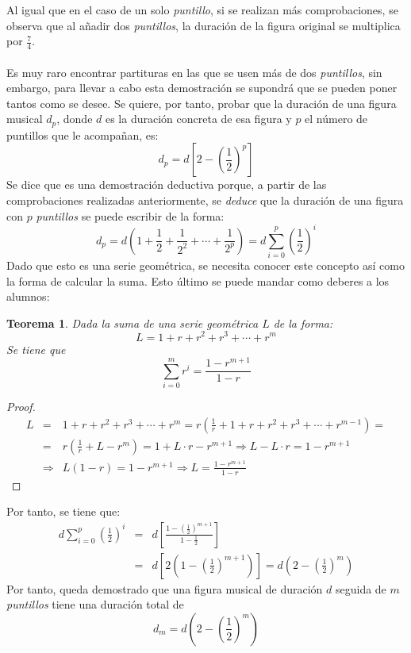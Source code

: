 \documentclass[a4paper, openright, 11pt, titlepage]{report}
\newtheorem{teor}[propo]{Teorema}
\theoremstyle{definition}\newtheorem{defin}[propo]{Definition}
\theoremstyle{definition}\newtheorem{obser}[propo]{Remark}
\theoremstyle{definition}\newtheorem{ejem}[propo]{Ejemplo}
\theoremstyle{definition}\newtheorem{algoritmo}[propo]{Algoritmo}
\begin{document}
\begin{itemize}
    Al igual que en el caso de un solo \textit{puntillo}, si se realizan más comprobaciones, se observa que al añadir dos \textit{puntillos}, la duración de la figura original se multiplica por $\frac{7}{4}$.\\\\
    Es muy raro encontrar partituras en las que se usen más de dos \textit{puntillos}, sin embargo, para llevar a cabo esta demostración se supondrá que se pueden poner tantos como se desee. Se quiere, por tanto, probar que la duración de una figura musical $d_{p}$, donde $d$ es la duración concreta de esa figura y $p$ el número de puntillos que le acompañan, es: $$d_{p} = d[2-(\frac{1}{2})^{p}]$$
    Se dice que es una demostración deductiva porque, a partir de las comprobaciones realizadas anteriormente, se \textit{deduce} que la duración de una figura con $p$ \textit{puntillos} se puede escribir de la forma: $$d_{p} = d(1 + \frac{1}{2} + \frac{1}{2^{2}} + \cdots + \frac{1}{2^{p}}) = d\sum_{i=0}^{p}(\frac{1}{2})^{i}$$
    Dado que esto es una serie geométrica, se necesita conocer este concepto así como la forma de calcular la suma. Esto último se puede mandar como deberes a los alumnos:
    \begin{teor}
    Dada la suma de una serie geométrica $L$ de la forma: 
    $$L = 1 + r + r^{2} + r^{3} + \cdots + r^{m}$$
    Se tiene que
    $$\sum_{i=0}^{m}r^{i} = \frac{1-r^{m+1}}{1-r}$$
    \end{teor}
    \begin{proof}
    \begin{eqnarray*}
    L & = & 1 + r + r^{2} + r^{3} + \cdots + r^{m} = r(\frac{1}{r} + 1 + r + r^{2} + r^{3} + \cdots + r^{m-1}) = \\
    & = & r(\frac{1}{r} + L - r^{m}) = 1 + L\cdot r - r^{m+1}  \Longrightarrow L - L\cdot r = 1 - r^{m+1} \\
    & \Longrightarrow & L(1-r) = 1-r^{m+1} \Longrightarrow \boxed{L = \frac{1-r^{m+1}}{1-r}}
    \end{eqnarray*}
    \end{proof}
    Por tanto, se tiene que:
    \begin{eqnarray*}
    d\sum_{i=0}^{p}(\frac{1}{2})^{i} & = & d\left[\frac{1-(\frac{1}{2})^{m+1}}{1-\frac{1}{2}}\right] \\
    & = & d[2(1-(\frac{1}{2})^{m+1})] = \boxed{d(2-(\frac{1}{2})^{m})}
    \end{eqnarray*}
    Por tanto, queda demostrado que una figura musical de duración $d$ seguida de $m$ \textit{puntillos} tiene una duración total de $$d_{m} = d(2-(\frac{1}{2})^{m})$$

\end{itemize}
\end{document}
